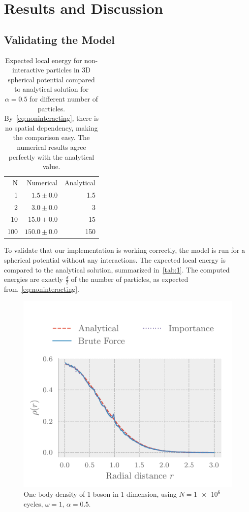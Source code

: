 \section{Results and Discussion}\label{sec:Discussion}
\subsection{Validating the Model}

\begin{table}[ht]
  \begin{tabular}{r|rr}
    \toprule
    N   & Numerical & Analytical \\
    1   & \(1.5\pm 0.0\)          &   1.5        \\
    2   &  \(3.0 \pm 0.0\)         &    3       \\
    10  & \(15.0\pm 0.0\)          &    15       \\
    100 &  \(150.0\pm 0.0\)         &   150        \\
    \bottomrule
  \end{tabular}
  \caption{Expected local energy for non-interactive particles in 3D spherical potential compared to analytical
    solution for \(\alpha = 0.5\) for different number of particles. By~\eqref{eq:noninteracting}, there is no
    spatial dependency, making the comparison easy. The numerical results agree
    perfectly with the analytical value.}
  \label{tab:1}
\end{table}

To validate that our implementation is working correctly, the model is run for a
spherical potential without any interactions. The expected local energy is
compared to the analytical solution, summarized in~\vref{tab:1}. The
computed energies are exactly \(\frac{d}{2}\) of the number of particles, as
expected from~\vref{eq:noninteracting}.

\begin{figure}[ht]
  \centering
  \includegraphics[]{figures/density1.pdf}
  \caption{One-body density of 1 boson in 1 dimension, using $N = \num{1e6}$ cycles, $\omega = 1$, $\alpha = 0.5$.}
  \label{fig:1 part 1 dim density}
\end{figure}

